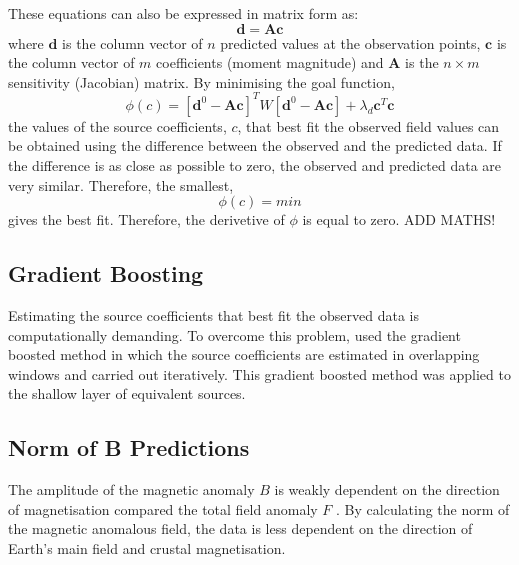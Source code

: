 These equations can also be expressed in matrix form as:
\begin{equation}
    \mathbf{d} = \mathbf{Ac}
\end{equation}
where $\mathbf{d}$ is the column vector of $n$ predicted values at the observation points, $\mathbf{c}$ is the column vector of $m$ coefficients (moment magnitude) and $\mathbf{A}$ is the $n \times m$ sensitivity (Jacobian) matrix. By minimising the goal function,
\begin{equation}
    \phi(c) = [\mathbf{d}^0 - \mathbf{Ac}]^T W[\mathbf{d}^0 - \mathbf{Ac}] + \lambda_d \mathbf{c}^T\mathbf{c}
\end{equation}
the values of the source coefficients, $c$, that best fit the observed field values can be obtained using the difference between the observed and the predicted data. If the difference is as close as possible to zero, the observed and predicted data are very similar. Therefore, the smallest,
\begin{equation}
    \phi(c) = min
\end{equation}
gives the best fit. Therefore, the derivetive of $\phi$ is equal to zero.
ADD MATHS!

\subsection{Gradient Boosting}
Estimating the source coefficients that best fit the observed data is computationally demanding. To overcome this problem, \cite{SolerUieda2021} used the gradient boosted method in which the source coefficients are estimated in overlapping windows and carried out iteratively. This gradient boosted method was applied to the shallow layer of equivalent sources.

\subsection{Norm of B Predictions}
The amplitude of the magnetic anomaly $B$ is weakly dependent on the direction of magnetisation compared the total field anomaly $F$ \cite{HidalgoGato2021}. By calculating the norm of the magnetic anomalous field, the data is less dependent on the direction of Earth’s main field and crustal magnetisation.


